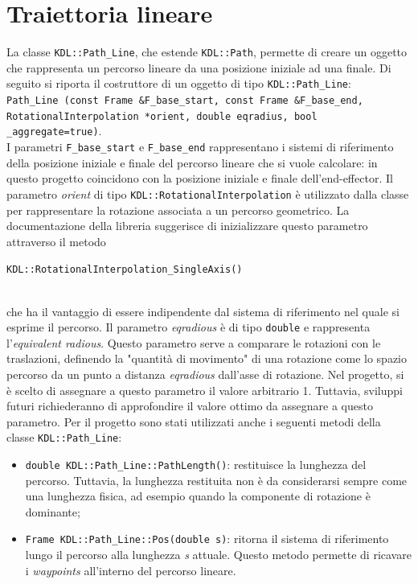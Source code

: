 \section{Traiettoria lineare} \label{cap_lt}
La classe \texttt{KDL::Path\_Line}, che estende \texttt{KDL::Path}, permette di creare un oggetto che rappresenta un percorso lineare da una posizione iniziale ad una finale. Di seguito si riporta il costruttore di un oggetto di tipo \texttt{KDL::Path\_Line}: \\ \texttt{Path\_Line (const Frame \&F\_base\_start, const Frame \&F\_base\_end, RotationalInterpolation *orient, double eqradius, bool \_aggregate=true)}.\\ I parametri \texttt{F\_base\_start} e \texttt{F\_base\_end} rappresentano i sistemi di riferimento della posizione iniziale e finale del percorso lineare che si vuole calcolare: in questo progetto coincidono con la posizione iniziale e finale dell'end-effector. Il parametro \textit{orient} di tipo \texttt{KDL::RotationalInterpolation} è utilizzato dalla classe per rappresentare la rotazione associata a un percorso geometrico. La documentazione della libreria suggerisce di inizializzare questo parametro attraverso il metodo \\ \centerline{\texttt{KDL::RotationalInterpolation\_SingleAxis()}} \\ che ha il vantaggio di essere indipendente dal sistema di riferimento nel quale si esprime il percorso. Il parametro \textit{eqradious} è di tipo \texttt{double} e rappresenta l'\textit{equivalent radious}. Questo parametro serve a comparare le rotazioni con le traslazioni, definendo la "quantità di movimento" di una rotazione come lo spazio percorso da un punto a distanza \textit{eqradious} dall'asse di rotazione. Nel progetto, si è scelto di assegnare a questo parametro il valore arbitrario 1. Tuttavia, sviluppi futuri richiederanno di approfondire il valore ottimo da assegnare a questo parametro.
Per il progetto sono stati utilizzati anche i seguenti metodi della classe \texttt{KDL::Path\_Line}:
\begin{itemize}
	\item \texttt{double KDL::Path\_Line::PathLength()}: restituisce la lunghezza del percorso. Tuttavia, la lunghezza restituita non è da considerarsi sempre come una lunghezza fisica, ad esempio quando la componente di rotazione è dominante;
	\item \texttt{Frame KDL::Path\_Line::Pos(double s)}: ritorna il sistema di riferimento lungo il percorso alla lunghezza \textit{s} attuale. Questo metodo permette di ricavare i \textit{waypoints} all'interno del percorso lineare.
\end{itemize}

